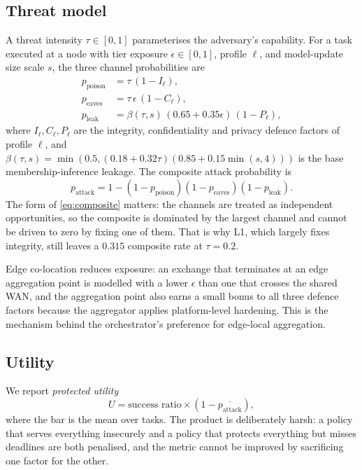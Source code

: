 \documentclass[journal,10pt]{IEEEtran}
\begin{document}
\subsection{Threat model}
A threat intensity $\tau\in[0,1]$ parameterises the adversary's capability. For
a task executed at a node with tier exposure $\epsilon\in[0,1]$, profile
$\ell$, and model-update size scale $s$, the three channel probabilities are
\begin{align}
p_{\text{poison}} &= \tau\,(1-I_\ell), \label{eq:poison}\\
p_{\text{eaves}}  &= \tau\,\epsilon\,(1-C_\ell), \label{eq:eaves}\\
p_{\text{leak}}   &= \beta(\tau,s)\,(0.65+0.35\epsilon)\,(1-P_\ell),
\label{eq:leak}
\end{align}
where $I_\ell,C_\ell,P_\ell$ are the integrity, confidentiality and privacy
defence factors of profile $\ell$, and
$\beta(\tau,s)=\min(0.5,(0.18+0.32\tau)(0.85+0.15\min(s,4)))$ is the base
membership-inference leakage. The composite attack probability is
\begin{equation}
p_{\text{attack}}=1-(1-p_{\text{poison}})(1-p_{\text{eaves}})(1-p_{\text{leak}}).
\label{eq:composite}
\end{equation}
The form of \eqref{eq:composite} matters: the channels are treated as
independent opportunities, so the composite is dominated by the largest channel
and cannot be driven to zero by fixing one of them. That is why L1, which
largely fixes integrity, still leaves a $0.315$ composite rate at
$\tau=0.2$.

Edge co-location reduces exposure: an exchange that terminates at an edge
aggregation point is modelled with a lower $\epsilon$ than one that crosses the
shared WAN, and the aggregation point also earns a small bonus to all three
defence factors because the aggregator applies platform-level hardening. This
is the mechanism behind the orchestrator's preference for edge-local
aggregation.

\subsection{Utility}
We report \emph{protected utility}
\begin{equation}
U=\text{success ratio}\times(1-\overline{p_{\text{attack}}}),
\label{eq:utility}
\end{equation}
where the bar is the mean over tasks. The product is deliberately harsh: a
policy that serves everything insecurely and a policy that protects everything
but misses deadlines are both penalised, and the metric cannot be improved by
sacrificing one factor for the other.
\end{document}
